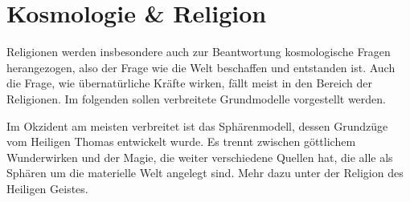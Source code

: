\documentclass[12pt,twoside,twocolumn,openany]{book}
\begin{document}
%
%

%
%	
%
%



\chapter{Kosmologie \& Religion}

	Religionen werden insbesondere auch zur Beantwortung kosmologische Fragen herangezogen, also der Frage wie die Welt beschaffen und entstanden ist. Auch die Frage, wie übernatürliche Kräfte wirken, fällt meist in den Bereich der Religionen.
	Im folgenden sollen verbreitete Grundmodelle vorgestellt werden.
	
	Im Okzident am meisten verbreitet ist das Sphärenmodell, dessen Grundzüge vom Heiligen Thomas entwickelt wurde. Es trennt zwischen göttlichem Wunderwirken und der Magie, die weiter verschiedene Quellen hat, die alle als Sphären um die materielle Welt angelegt sind. Mehr dazu unter der Religion des Heiligen Geistes.
	
\end{document}
